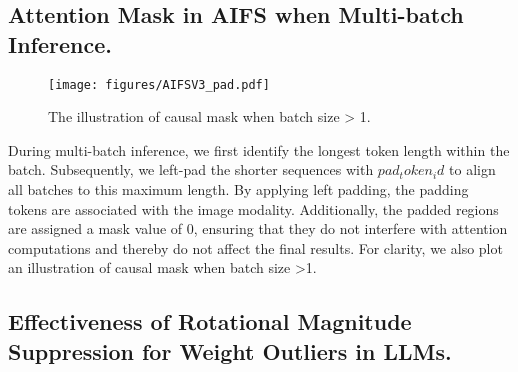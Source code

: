\subsection{Attention Mask in AIFS when Multi-batch Inference.}
\label{multi-batch mask}
\begin{wrapfigure}{r}{5.5cm}
  \vspace{-13mm}
    \texttt{[image: figures/AIFSV3\_pad.pdf]}
    \caption{The illustration of causal mask when batch size > 1.}
  \label{mask_mutli-batch}
  \vspace{-8mm}
\end{wrapfigure}
During multi-batch inference, we first identify the longest token length within the batch. Subsequently, we left-pad the shorter sequences with $pad_token_id$ to align all batches to this maximum length. By applying left padding, the padding tokens are associated with the image modality. Additionally, the padded regions are assigned a mask value of 0, ensuring that they do not interfere with attention computations and thereby do not affect the final results. For clarity, we also plot an illustration of causal mask when batch size >1.

\subsection{Effectiveness of Rotational Magnitude Suppression for Weight Outliers in LLMs.}
\begin{table}[h]
\caption{WikiText-2 perplexity (PPL) on 4-bit quantized LLaMA2 models with an input sequence length of 2048. Lower PPL is better.}
\label{table:quarot+rms}
\centering
{}
\end{table}

